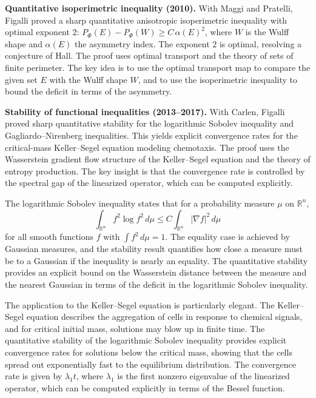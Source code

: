\textbf{Quantitative isoperimetric inequality (2010).} With Maggi and Pratelli, Figalli proved a sharp quantitative anisotropic isoperimetric inequality with optimal exponent 2: $P_\Phi(E) - P_\Phi(W) \ge C\,\alpha(E)^2$, where $W$ is the Wulff shape and $\alpha(E)$ the asymmetry index. The exponent 2 is optimal, resolving a conjecture of Hall. The proof uses optimal transport and the theory of sets of finite perimeter. The key idea is to use the optimal transport map to compare the given set $E$ with the Wulff shape $W$, and to use the isoperimetric inequality to bound the deficit in terms of the asymmetry.

\textbf{Stability of functional inequalities (2013--2017).} With Carlen, Figalli proved sharp quantitative stability for the logarithmic Sobolev inequality and Gagliardo--Nirenberg inequalities. This yields explicit convergence rates for the critical-mass Keller--Segel equation modeling chemotaxis. The proof uses the Wasserstein gradient flow structure of the Keller--Segel equation and the theory of entropy production. The key insight is that the convergence rate is controlled by the spectral gap of the linearized operator, which can be computed explicitly.

The logarithmic Sobolev inequality states that for a probability measure $\mu$ on $\mathbb{R}^n$,
\[
\int_{\mathbb{R}^n} f^2 \log f^2 \, d\mu \le C \int_{\mathbb{R}^n} |\nabla f|^2 \, d\mu
\]
for all smooth functions $f$ with $\int f^2 \, d\mu = 1$. The equality case is achieved by Gaussian measures, and the stability result quantifies how close a measure must be to a Gaussian if the inequality is nearly an equality. The quantitative stability provides an explicit bound on the Wasserstein distance between the measure and the nearest Gaussian in terms of the deficit in the logarithmic Sobolev inequality.

The application to the Keller--Segel equation is particularly elegant. The Keller--Segel equation describes the aggregation of cells in response to chemical signals, and for critical initial mass, solutions may blow up in finite time. The quantitative stability of the logarithmic Sobolev inequality provides explicit convergence rates for solutions below the critical mass, showing that the cells spread out exponentially fast to the equilibrium distribution. The convergence rate is given by $\lambda_1 t$, where $\lambda_1$ is the first nonzero eigenvalue of the linearized operator, which can be computed explicitly in terms of the Bessel function.

